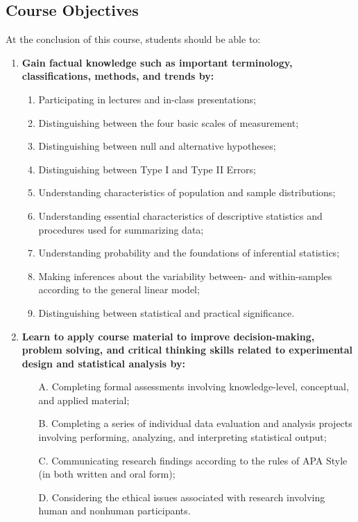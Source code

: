 \documentclass[article]{article}
\begin{document}

\subsection{Course Objectives}
At the conclusion of this course, students should be able to:\\

\begin{enumerate}
\item {\bf{Gain factual knowledge such as important terminology, classifications, methods, and trends by:}}

\begin{enumerate}[label=\Alph*.]
\itemsep2pt\parskip0pt
\item Participating in lectures and in-class presentations;
\item Distinguishing between the four basic scales of measurement;
\item Distinguishing between null and alternative hypotheses;
\item Distinguishing between Type I and Type II Errors;
\item Understanding characteristics of population and sample distributions;
\item Understanding essential characteristics of descriptive statistics and procedures used for summarizing data;
\item Understanding probability and the foundations of inferential statistics;
\item Making inferences about the variability between- and within-samples according to the general linear model;
\item Distinguishing between statistical and practical significance.
\end{enumerate}

\item {\bf{Learn to apply course material to improve decision-making, problem solving, and critical thinking skills related to experimental design and statistical analysis by:}}

\begin{enumerate}[label=\Alph*.]
\itemsep2pt\parskip0pt
\item[A.] Completing formal assessments involving knowledge-level, conceptual, and applied material;
\item[B.] Completing a series of individual data evaluation and analysis projects involving performing, analyzing, and interpreting statistical output;
\item[C.] Communicating research findings according to the rules of APA Style (in both written and oral form);
\item[D.] Considering the ethical issues associated with research involving human and nonhuman participants.
\end{enumerate}
\end{enumerate}
\end{document}
